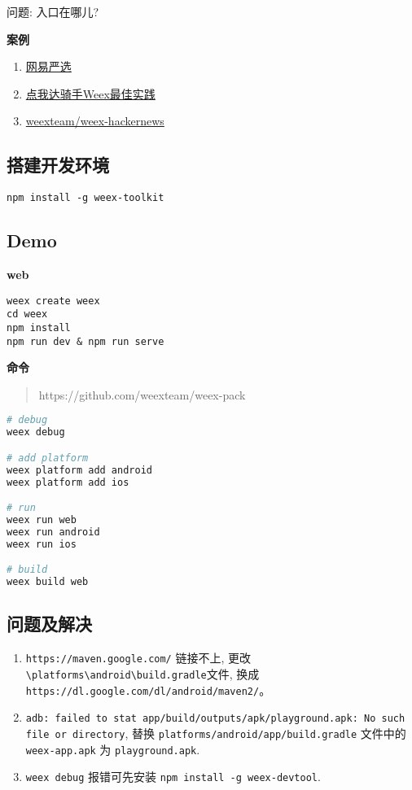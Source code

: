 问题: 入口在哪儿?

\textbf{案例}

\begin{enumerate}
\def\labelenumi{\arabic{enumi}.}
\tightlist
\item
  \href{https://github.com/zwwill/yanxuan-weex-demo}{网易严选}
\item
  \href{https://mp.weixin.qq.com/s/dowOE_QpZrtV5GH9EAgyHg}{点我达骑手Weex最佳实践}
\item
  \href{https://github.com/weexteam/weex-hackernews}{weexteam/weex-hackernews}
\end{enumerate}

\subsection{搭建开发环境}\label{ux642dux5efaux5f00ux53d1ux73afux5883}

\begin{lstlisting}
npm install -g weex-toolkit
\end{lstlisting}

\subsection{Demo}\label{demo}

\textbf{web}

\begin{lstlisting}
weex create weex
cd weex
npm install
npm run dev & npm run serve
\end{lstlisting}

\textbf{命令}

\begin{quote}
https://github.com/weexteam/weex-pack
\end{quote}

\begin{lstlisting}[language=bash]
# debug
weex debug

# add platform
weex platform add android
weex platform add ios

# run
weex run web
weex run android
weex run ios

# build
weex build web
\end{lstlisting}

\subsection{问题及解决}\label{ux95eeux9898ux53caux89e3ux51b3-1}

\begin{enumerate}
\def\labelenumi{\arabic{enumi}.}
\tightlist
\item
  \lstinline!https://maven.google.com/! 链接不上,
  更改\lstinline!\platforms\android\build.gradle!文件, 换成
  \lstinline!https://dl.google.com/dl/android/maven2/!。
\item
  \lstinline!adb: failed to stat app/build/outputs/apk/playground.apk: No such file or directory!,
  替换 \lstinline!platforms/android/app/build.gradle! 文件中的
  \lstinline!weex-app.apk! 为 \lstinline!playground.apk!.
\item
  \lstinline!weex debug! 报错可先安装
  \lstinline!npm install -g weex-devtool!.
\end{enumerate}
